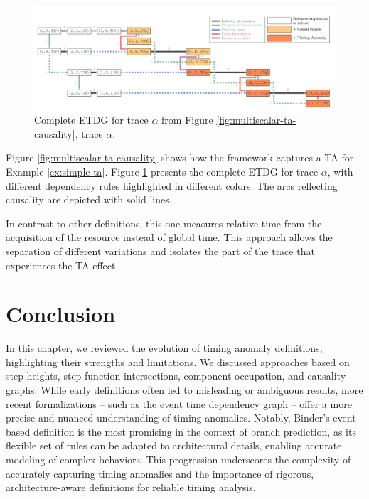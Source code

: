\begin{figure}[htbp]
    \centering
    \includegraphics[width=\textwidth]{figures/ETDG.png}
    \caption{Complete ETDG for trace $\alpha$ from Figure \ref{fig:multiscalar-ta-causality}, trace $\alpha$. }
    \label{fig:ETDG}
\end{figure}

Figure \ref{fig:multiscalar-ta-causality} shows how the framework captures a TA for Example \ref{ex:simple-ta}. Figure \ref{fig:ETDG} presents the complete ETDG for trace $\alpha$, with different dependency rules highlighted in different colors. The arcs reflecting causality are depicted with solid lines.

In contrast to other definitions, this one measures relative time from the acquisition of the resource instead of global time. This approach allows the separation of different variations and isolates the part of the trace that experiences the TA effect.


\section{Conclusion}

In this chapter, we reviewed the evolution of timing anomaly definitions, highlighting their strengths and limitations. We discussed approaches based on step heights, step-function intersections, component occupation, and causality graphs. While early definitions often led to misleading or ambiguous results, more recent formalizations -- such as the event time dependency graph -- offer a more precise and nuanced understanding of timing anomalies. Notably, Binder's event-based definition is the most promising in the context of branch prediction, as its flexible set of rules can be adapted to architectural details, enabling accurate modeling of complex behaviors. This progression underscores the complexity of accurately capturing timing anomalies and the importance of rigorous, architecture-aware definitions for reliable timing analysis.